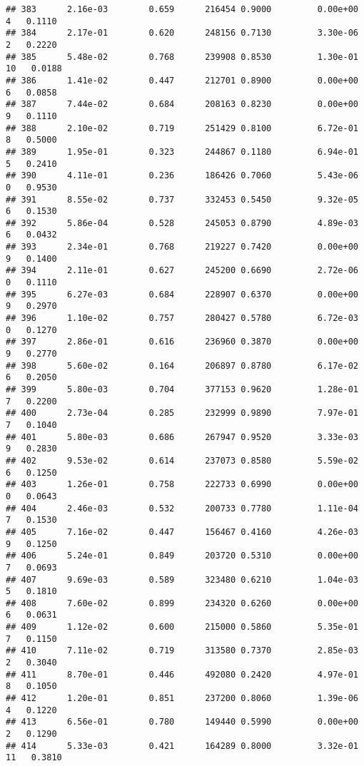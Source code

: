 \documentclass[
]{article}
\begin{document}
\begin{verbatim}
## 383      2.16e-03        0.659      216454 0.9000         0.00e+00   4   0.1110
## 384      2.17e-01        0.620      248156 0.7130         3.30e-06   2   0.2220
## 385      5.48e-02        0.768      239908 0.8530         1.30e-01  10   0.0188
## 386      1.41e-02        0.447      212701 0.8900         0.00e+00   6   0.0858
## 387      7.44e-02        0.684      208163 0.8230         0.00e+00   9   0.1110
## 388      2.10e-02        0.719      251429 0.8100         6.72e-01   8   0.5000
## 389      1.95e-01        0.323      244867 0.1180         6.94e-01   5   0.2410
## 390      4.11e-01        0.236      186426 0.7060         5.43e-06   0   0.9530
## 391      8.55e-02        0.737      332453 0.5450         9.32e-05   6   0.1530
## 392      5.86e-04        0.528      245053 0.8790         4.89e-03   6   0.0432
## 393      2.34e-01        0.768      219227 0.7420         0.00e+00   9   0.1400
## 394      2.11e-01        0.627      245200 0.6690         2.72e-06   0   0.1110
## 395      6.27e-03        0.684      228907 0.6370         0.00e+00   9   0.2970
## 396      1.10e-02        0.757      280427 0.5780         6.72e-03   0   0.1270
## 397      2.86e-01        0.616      236960 0.3870         0.00e+00   9   0.2770
## 398      5.60e-02        0.164      206897 0.8780         6.17e-02   6   0.2050
## 399      5.80e-03        0.704      377153 0.9620         1.28e-01   7   0.2200
## 400      2.73e-04        0.285      232999 0.9890         7.97e-01   7   0.1040
## 401      5.80e-03        0.686      267947 0.9520         3.33e-03   9   0.2830
## 402      9.53e-02        0.614      237073 0.8580         5.59e-02   6   0.1250
## 403      1.26e-01        0.758      222733 0.6990         0.00e+00   0   0.0643
## 404      2.46e-03        0.532      200733 0.7780         1.11e-04   7   0.1530
## 405      7.16e-02        0.447      156467 0.4160         4.26e-03   9   0.1250
## 406      5.24e-01        0.849      203720 0.5310         0.00e+00   7   0.0693
## 407      9.69e-03        0.589      323480 0.6210         1.04e-03   5   0.1810
## 408      7.60e-02        0.899      234320 0.6260         0.00e+00   6   0.0631
## 409      1.12e-02        0.600      215000 0.5860         5.35e-01   7   0.1150
## 410      7.11e-02        0.719      313580 0.7370         2.85e-03   2   0.3040
## 411      8.70e-01        0.446      492080 0.2420         4.97e-01   8   0.1050
## 412      1.20e-01        0.851      237200 0.8060         1.39e-06   4   0.1220
## 413      6.56e-01        0.780      149440 0.5990         0.00e+00   2   0.1290
## 414      5.33e-03        0.421      164289 0.8000         3.32e-01  11   0.3810

\end{verbatim}
\end{document}
